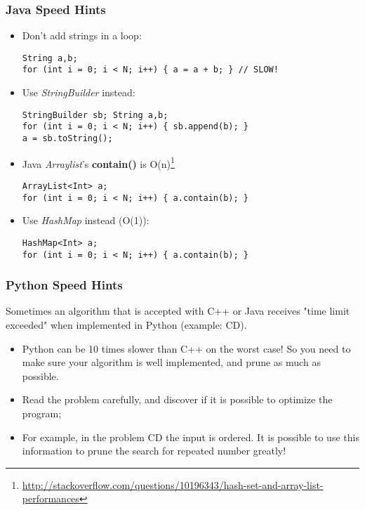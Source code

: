 \begin{frame}[fragile]
  \frametitle{Java Speed Hints}

  \begin{itemize}
      \item Don't add strings in a loop:
    {\small
\begin{verbatim}
String a,b;
for (int i = 0; i < N; i++) { a = a + b; } // SLOW!
\end{verbatim}
    }
  \item Use \emph{StringBuilder} instead:
    {\small
\begin{verbatim}
StringBuilder sb; String a,b;
for (int i = 0; i < N; i++) { sb.append(b); }
a = sb.toString();
\end{verbatim}
    }

  \item Java \emph{Arraylist}'s {\bf contain()} is O(n)\footnote{\url{http://stackoverflow.com/questions/10196343/hash-set-and-array-list-performances}}
    {\small
\begin{verbatim}
ArrayList<Int> a;
for (int i = 0; i < N; i++) { a.contain(b); }
\end{verbatim}
    }
  \item Use \emph{HashMap} instead (O(1)):
    {\small
\begin{verbatim}
HashMap<Int> a;
for (int i = 0; i < N; i++) { a.contain(b); }
\end{verbatim}
    }
  \end{itemize}
\end{frame}

\begin{frame}
  \frametitle{Python Speed Hints}
  \begin{block}{}
    Sometimes an algorithm that is accepted with C++ or Java receives "time limit exceeded" when implemented in Python (example: CD).
  \end{block}
  \bigskip

  \begin{itemize}
  \item Python can be 10 times slower than C++ on the worst case! So you need to make sure your algorithm is well implemented, and prune as much as possible.\bigskip

  \item Read the problem carefully, and discover if it is possible to optimize the program;\bigskip

  \item For example, in the problem CD the input is ordered. It is possible to use this information to prune the search for repeated number greatly! 
  \end{itemize}
\end{frame}


